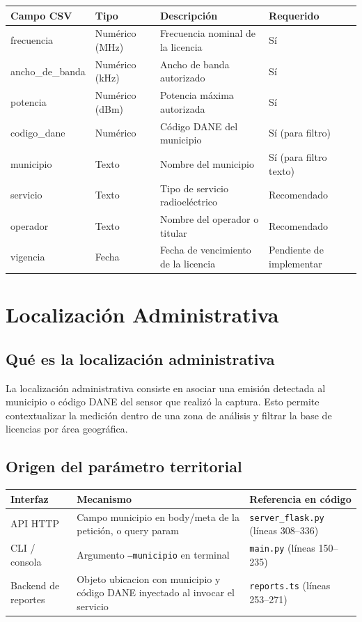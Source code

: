 \begin{tabular}{p{5cm}p{3cm}p{5cm}p{2cm}}
\textbf{Campo CSV} & \textbf{Tipo} & \textbf{Descripción} & \textbf{Requerido} \\
\hline
frecuencia & Numérico (MHz) & Frecuencia nominal de la licencia & Sí \\
ancho\_de\_banda & Numérico (kHz) & Ancho de banda autorizado & Sí \\
potencia & Numérico (dBm) & Potencia máxima autorizada & Sí \\
codigo\_dane & Numérico & Código DANE del municipio & Sí (para filtro) \\
municipio & Texto & Nombre del municipio & Sí (para filtro texto) \\
servicio & Texto & Tipo de servicio radioeléctrico & Recomendado \\
operador & Texto & Nombre del operador o titular & Recomendado \\
vigencia & Fecha & Fecha de vencimiento de la licencia & Pendiente de implementar \\
\end{tabular}

\section{Localización Administrativa}

\subsection{Qué es la localización administrativa}

La localización administrativa consiste en asociar una emisión detectada al municipio o código DANE del sensor que realizó la captura. Esto permite contextualizar la medición dentro de una zona de análisis y filtrar la base de licencias por área geográfica.

\subsection{Origen del parámetro territorial}

\begin{tabular}{p{4cm}p{6cm}p{4cm}}
\textbf{Interfaz} & \textbf{Mecanismo} & \textbf{Referencia en código} \\
\hline
API HTTP & Campo municipio en body/meta de la petición, o query param & \texttt{server\_flask.py} (líneas 308--336) \\
CLI / consola & Argumento \texttt{--municipio} en terminal & \texttt{main.py} (líneas 150--235) \\
Backend de reportes & Objeto ubicacion con municipio y código DANE inyectado al invocar el servicio & \texttt{reports.ts} (líneas 253--271) \\
\end{tabular}

